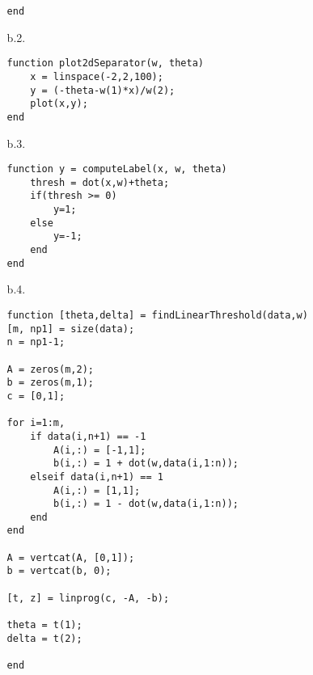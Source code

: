 \begin{enumerate}
\begin{enumerate}
\begin{verbatim}
end
      \end{verbatim}
      \item [b.2.]
      \begin{verbatim}
function plot2dSeparator(w, theta)
    x = linspace(-2,2,100);
    y = (-theta-w(1)*x)/w(2);
    plot(x,y);
end
      \end{verbatim}  
      \item [b.3.]
      \begin{verbatim}
function y = computeLabel(x, w, theta)
    thresh = dot(x,w)+theta;
    if(thresh >= 0)
        y=1;
    else
        y=-1;
    end
end
      \end{verbatim}
      \item [b.4.]
      \begin{verbatim}
function [theta,delta] = findLinearThreshold(data,w)
[m, np1] = size(data);
n = np1-1;

A = zeros(m,2);
b = zeros(m,1);
c = [0,1];

for i=1:m,
    if data(i,n+1) == -1
        A(i,:) = [-1,1];
        b(i,:) = 1 + dot(w,data(i,1:n));
    elseif data(i,n+1) == 1
        A(i,:) = [1,1];
        b(i,:) = 1 - dot(w,data(i,1:n));
    end         
end

A = vertcat(A, [0,1]);
b = vertcat(b, 0);

[t, z] = linprog(c, -A, -b);

theta = t(1);
delta = t(2);

end
      \end{verbatim} 
      \end{enumerate}
\end{enumerate}



